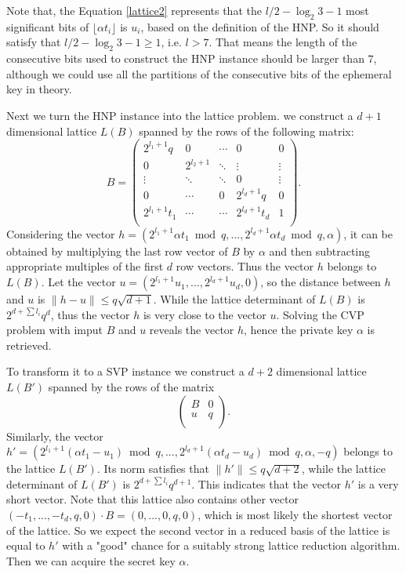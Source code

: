 Note that, the Equation \ref{lattice2} represents that the $l/2-\log_{2}{3} -1$ most significant bits of $\lfloor\alpha t_i\rfloor$ is $u_i$, based on the definition of the HNP.
So it should satisfy that $l/2-\log_{2}{3} -1 \geq 1$, i.e. $l > 7$. 
That means the length of the consecutive bits used to  construct the HNP instance should be larger than $7$, 
although we could use all the partitions of the consecutive bits of the ephemeral key in theory.

Next we turn the HNP instance into the lattice problem.
we construct a $d+1$ dimensional lattice $L(B)$ spanned by the rows of the following matrix:
$$B =
\left(
  \begin{array}{ccccc}
    2^{l_1+1}q & 0 & \cdots & 0 & 0 \\
    0 & 2^{l_2+1} & \ddots & \vdots & \vdots \\
    \vdots & \ddots & \ddots & 0 & \vdots \\
    0 & \cdots & 0 & 2^{l_d+1}q & 0 \\
    2^{l_1+1}t_1 & \cdots & \cdots & 2^{l_d+1}t_d & 1 \\
  \end{array}
\right).
$$
Considering the vector $h = (2^{l_1+1}\alpha t_1 \bmod q, ..., 2^{l_d+1}\alpha t_d \bmod q, \alpha)$,
 it can be obtained by multiplying the last row vector of $B$ by $\alpha$ and then subtracting appropriate multiples of the first $d$ row vectors.
Thus the vector $h$ belongs to $L(B)$.
Let the vector $u = (2^{l_1+1}u_1, ..., 2^{l_d+1}u_d, 0)$,
 so the distance between $h$ and $u$ is $\|h - u\| \leq q\sqrt{d+1}$.
While the lattice determinant of $L(B)$ is $2^{d + \sum{l_i}}q^d$,
 thus the vector $h$ is very close to the vector $u$.
Solving the CVP problem with imput $B$ and $u$ reveals the vector $h$,
 hence the private key $\alpha$ is retrieved.

To transform it to a SVP instance we construct a $d+2$ dimensional lattice $L(B')$ spanned by the rows of the matrix
$$
\left(
  \begin{array}{cc}
    B & 0 \\
    u & q \\
  \end{array}
\right).
$$
Similarly, the vector $h' = (2^{l_1+1}(\alpha t_1 - u_1) \bmod q, ..., 2^{l_d+1}(\alpha t_d - u_d) \bmod q, \alpha, -q)$ belongs to the lattice $L(B')$.
 Its norm satisfies that $\|h'\| \leq q\sqrt{d+2}$,
  while the lattice determinant of $L(B')$ is $2^{d + \sum{l_i}}q^{d+1}$.
   This indicates that the vector $h'$ is a very short vector.
Note that this lattice also contains other vector $(-t_1, ..., -t_d, q, 0)\cdot B = (0, ..., 0, q, 0)$,
 which is most likely the shortest vector of the lattice.
So we expect the second vector in a reduced basis of the lattice is equal to $h'$ with a "good" chance for a suitably strong lattice reduction algorithm.
Then we can acquire the secret key $\alpha$.

